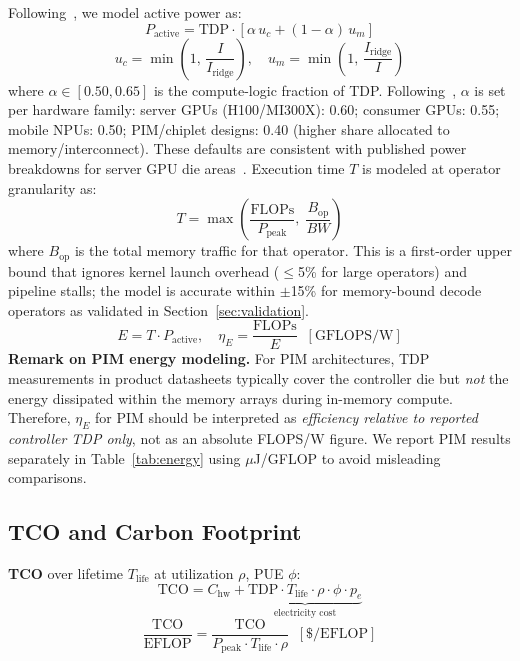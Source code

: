 \documentclass[journal]{IEEEtran}
\begin{document}
Following~\cite{energyroofline}, we model active power as:
\begin{equation}
  P_\text{active} = \text{TDP}\cdot\!\left[\alpha\,u_c + (1-\alpha)\,u_m\right]
  \label{eq:power}
\end{equation}
\begin{equation}
  u_c = \min\!\left(1,\,\frac{I}{I_\text{ridge}}\right),\quad
  u_m = \min\!\left(1,\,\frac{I_\text{ridge}}{I}\right)
  \label{eq:util}
\end{equation}
where $\alpha\in[0.50,0.65]$ is the compute-logic fraction of TDP.
Following~\cite{energyroofline}, $\alpha$ is set per hardware family:
server GPUs (H100/MI300X): 0.60; consumer GPUs: 0.55; mobile NPUs: 0.50;
PIM/chiplet designs: 0.40 (higher share allocated to memory/interconnect).
These defaults are consistent with published power breakdowns for server
GPU die areas~\cite{energyroofline}.
Execution time $T$ is modeled at operator granularity as:
\begin{equation}
  T = \max\!\left(\frac{\text{FLOPs}}{P_\text{peak}},\;\frac{B_\text{op}}{BW}\right)
  \label{eq:time}
\end{equation}
where $B_\text{op}$ is the total memory traffic for that operator.
This is a first-order upper bound that ignores kernel launch overhead
($\leq$5\% for large operators) and pipeline stalls; the model is
accurate within $\pm$15\% for memory-bound decode operators as
validated in Section~\ref{sec:validation}.
\begin{equation}
  E = T\cdot P_\text{active},\quad
  \eta_E = \frac{\text{FLOPs}}{E}\;\;[\text{GFLOPS/W}]
  \label{eq:energy_eff}
\end{equation}
\noindent\textbf{Remark on PIM energy modeling.}
For PIM architectures, TDP measurements in product datasheets typically
cover the controller die but \emph{not} the energy dissipated within
the memory arrays during in-memory compute.
Therefore, $\eta_E$ for PIM should be interpreted as
\emph{efficiency relative to reported controller TDP only}, not as an
absolute FLOPS/W figure. We report PIM results separately in
Table~\ref{tab:energy} using $\mu$J/GFLOP to avoid
misleading comparisons.

\subsection{TCO and Carbon Footprint}

\textbf{TCO} over lifetime $T_\text{life}$ at utilization $\rho$, PUE $\phi$:
\begin{equation}
  \text{TCO} = C_\text{hw} +
    \underbrace{\text{TDP}\cdot T_\text{life}\cdot\rho\cdot\phi\cdot p_e}
    _{\text{electricity cost}}
  \label{eq:tco}
\end{equation}
\begin{equation}
  \frac{\text{TCO}}{\text{EFLOP}} =
    \frac{\text{TCO}}{P_\text{peak}\cdot T_\text{life}\cdot\rho}
    \;\;[\text{\$/EFLOP}]
  \label{eq:tco_eflop}
\end{equation}
\end{document}
